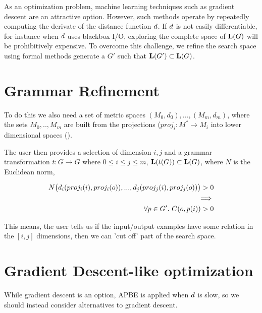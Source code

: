 As an optimization problem, machine learning techniques such as gradient descent are an attractive option.
However, such methods operate by repeatedly computing the derivate of the distance function ${d}$.
If ${d}$ is not easily differentiable, for instance when ${d}$ uses blackbox I/O, exploring the complete space of $\mathbf{L}(G)$ will be prohibitively expensive.
To overcome this challenge, we refine the search space using formal methods generate a $G'$ such that $\mathbf{L}(G') \subset \mathbf{L}(G)$.

\section{Grammar Refinement}
To do this we also need a set of metric spaces $(M_0,d_0),...,(M_m,d_m)$, where the sets $M_0,..,M_m$ are built from the projections ($proj_i:M^{*} \to M_i$ into lower dimensional spaces ().

The user then provides a selection of dimension $i,j$  and a grammar transformation $t:G \to G$ where $0 \leq i \leq j \leq m$, $\mathbf{L}(t(G)) \subset \mathbf{L}(G)$, where $N$ is the Euclidean norm,

\begin{align*}
  N\big{(} d_i(proj_i(i),proj_i(o)) ,..., d_j(proj_j(i),proj_j(o)) \big{)} > 0 \\
\implies \\
\forall p \in G'.\ C(o,p(i)) > 0 \\
\end{align*}

This means, the user tells us if the input/output examples have some relation in the $[i,j]$ dimensions, then we can 'cut off' part of the search space.

\section{Gradient Descent-like optimization}

While gradient descent is an option, APBE is applied when ${d}$ is slow, so we should instead consider alternatives to gradient descent.
